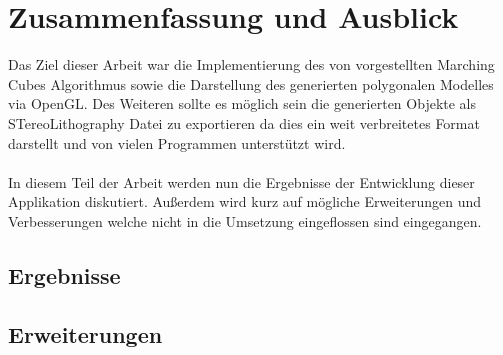 \chapter{Zusammenfassung und Ausblick}
Das Ziel dieser Arbeit war die Implementierung des von \citep{MCAlgo} vorgestellten Marching Cubes Algorithmus sowie die Darstellung des generierten polygonalen Modelles via OpenGL. Des Weiteren sollte es möglich sein die generierten Objekte als STereoLithography Datei zu exportieren da dies ein weit verbreitetes Format darstellt und von vielen Programmen unterstützt wird.\\
\\
In diesem Teil der Arbeit werden nun die Ergebnisse der Entwicklung dieser Applikation diskutiert. Außerdem wird kurz auf mögliche Erweiterungen und Verbesserungen welche nicht in die Umsetzung eingeflossen sind eingegangen.

\section{Ergebnisse}

\section{Erweiterungen}